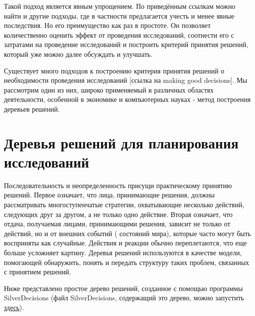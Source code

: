 Такой подход является явным упрощением. По приведённым ссылкам можно найти и другие подходы, где в частности предлагается учесть и менее явные последствия. Но его преимущество как раз в простоте. Он позволяет количественно оценить эффект от проведения исследований, соотнести его с затратами на проведение исследований и построить критерий принятия решений, который уже можно далее обсуждать и улучшать. 


Существует много подходов к построению критерия принятия решений о необходимости проведения исследований [ссылка на making good decisions]. Мы рассмотрим один из них, широко применяемый в различных областях деятельности, особенной в экономике и компьютерных науках - метод построения деревьев решений. \cite{AL_appl_patt_2007}

\section{Деревья решений для планирования исследований}

Последовательность и неопределенность присущи практическому принятию решений. Первое означает, что лица, принимающие решения, должны рассматривать многоступенчатые стратегии, охватывающие несколько действий, следующих друг за другом, а не только одно действие. Вторая означает, что отдача, получаемая лицами, принимающими решения, зависит не только от действий, но и от внешних событий ( состояний мира), которые часто могут быть восприняты как случайные. Действия и реакции обычно переплетаются, что еще больше усложняет картину. Деревья решений используются в качестве модели, помогающей обнаружить, понять и передать структуру таких проблем, связанных с принятием решений.

Ниже представлено простое дерево решений, созданное с помощью программы SilverDecisions (файл SilverDecisions, содержащий это дерево, можно запустить \href{http://silverdecisions.pl/SilverDecisions.html?LOAD_SD_TREE_JSON=https://raw.githubusercontent.com/gubkin-rienm/isp/master/data/decision_tree/simple_invest_decision.json}{здесь}).

